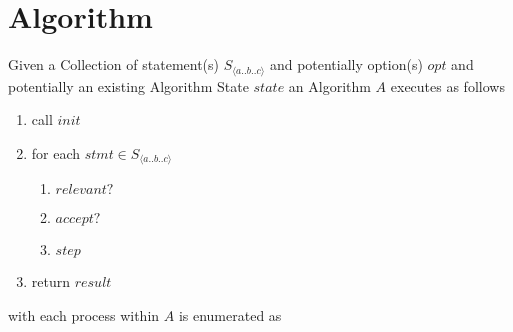 \documentclass[../main.tex]{subfiles}
\begin{document}
\section{Algorithm}
Given a Collection of statement(s) $S_{\langle a..b..c \rangle}$ and potentially option(s) $opt$ and potentially an existing Algorithm State $state$ an Algorithm $A$ executes as follows

\begin{enumerate}
\item call $init$
\item for each $stmt \in S_{\langle a..b..c \rangle}$
  \begin{enumerate}
  \item $relevant?$
  \item $accept?$
  \item $step$
  \end{enumerate}
\item return $result$
\end{enumerate}
with each process within $A$ is enumerated as
\end{document}
